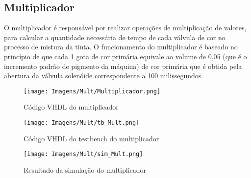 \documentclass[12pt,a4paper,oneside]{abntex2}
\begin{document}
            \subsection{Multiplicador}
                O multiplicador é responsável por realizar operações de multiplicação de valores,  para calcular a quantidade necessária de tempo de cada válvula de cor no processo de mistura da tinta. O funcionamento do multiplicador é baseado no princípio de que cada 1 gota de cor primária equivale ao volume de 0,05 (que é o incremento padrão de pigmento da máquina) de cor primária que é obtida pela abertura da válvula solenóide correspondente a 100 milissegundos.
        
                \begin{figure}[H]
                    \centering
                    \texttt{[image: Imagens/Mult/Multiplicador.png]}
                    \caption{Código VHDL do multiplicador}
                    \label{fig:Multiplicador}
                \end{figure}
               \begin{figure}[H]
                    \centering
                    \texttt{[image: Imagens/Mult/tb\_Mult.png]}
                    \caption{Código VHDL do testbench do multiplicador}
                    \label{fig:tb_Multiplicador}
                \end{figure}

                \begin{figure}[H]
                    \centering
                    \texttt{[image: Imagens/Mult/sim\_Mult.png]}
                    \caption{Resultado da simulação do multiplicador}
                    \label{fig:sim_Multiplicador}
                \end{figure}
        
\end{document}
